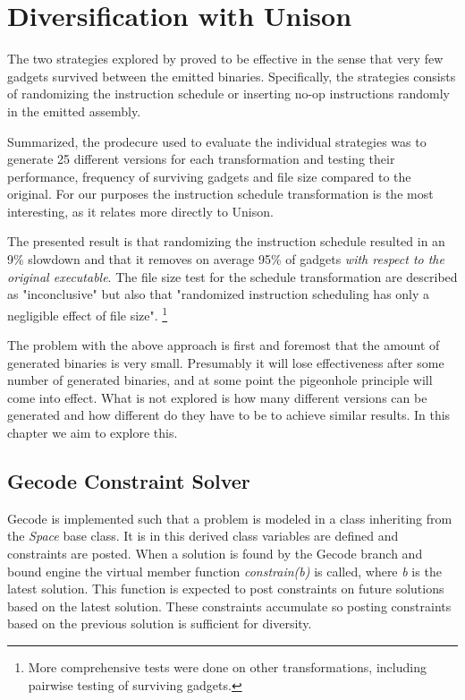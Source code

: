 \chapter{Diversification with Unison}

The two strategies explored by \textcite{large-scale-automated} proved to be effective in
the sense that very few gadgets survived between the emitted binaries. Specifically, the
strategies consists of randomizing the instruction schedule or inserting no-op instructions
randomly in the emitted assembly.

Summarized, the prodecure \textcite{large-scale-automated} used to evaluate the individual
strategies was to generate 25 different versions for each transformation and testing their
performance, frequency of surviving gadgets and file size compared to the original. For
our purposes the instruction schedule transformation is the most interesting, as it relates
more directly to Unison.

The presented result is that randomizing the instruction schedule resulted in an 9\%
slowdown and that it removes on average 95\% of gadgets \textit{with respect to the original executable}.
The file size test for the schedule transformation are described as "inconclusive" but
also that "randomized instruction scheduling has only a negligible effect of file size".
\footnote{More comprehensive tests were done on other transformations, including pairwise
testing of surviving gadgets.}

The problem with the above approach is first and foremost that the amount of generated
binaries is very small. Presumably it will lose effectiveness after some number of
generated binaries, and at some point the pigeonhole principle will come into effect.
What is not explored is how many different versions can be generated and how different do
they have to be to achieve similar results. In this chapter we aim to explore this.

\section{Gecode Constraint Solver}

Gecode is implemented such that a problem is modeled in a class inheriting from the
\textit{Space} base class. It is in this derived class variables are defined and constraints
are posted. When a solution is found by the Gecode branch and bound engine the virtual
member function \textit{constrain(b)} is called, where \textit{b} is the latest solution.
This function is expected to post constraints on future solutions based on the latest
solution. These constraints accumulate so posting constraints based on the previous solution
is sufficient for diversity.


